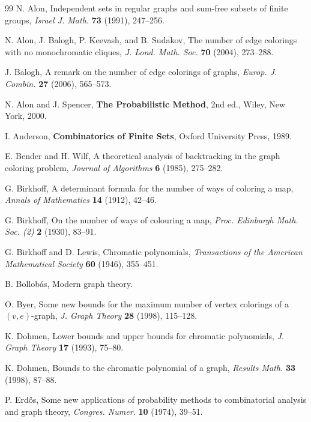 \documentclass[11pt]{article}
\begin{document}
\begin{thebibliography}{99}
 N. Alon, Independent sets in regular graphs
  and sum-free subsets of finite groups, \emph{Israel J. Math.}
  \textbf{73} (1991), 247--256.

 N. Alon, J. Balogh, P. Keevash, and B. Sudakov, The
  number of edge colorings with no monochromatic cliques,
  \emph{J. Lond. Math. Soc.} \textbf{70} (2004), 273--288.

 J. Balogh, A remark on the number of edge colorings
  of graphs, \emph{Europ. J. Combin.} \textbf{27} (2006), 565--573.

 N. Alon and J. Spencer, {\bf The Probabilistic Method},
  2nd ed., Wiley, New York, 2000.

 I. Anderson, \textbf{Combinatorics of Finite
    Sets}, Oxford University Press, 1989.

 E. Bender and H. Wilf, A theoretical analysis of
  backtracking in the graph coloring problem, \emph{Journal of
    Algorithms} \textbf{6} (1985), 275--282.


 G. Birkhoff, A determinant formula for the
  number of ways of coloring a map, \emph{Annals of Mathematics}
  \textbf{14} (1912), 42--46.

 G. Birkhoff, On the number of ways of
  colouring a map, \emph{Proc. Edinburgh Math. Soc. (2)} \textbf{2}
  (1930), 83--91.

 G. Birkhoff and D. Lewis, Chromatic
  polynomials, \emph{Transactions of the American Mathematical
    Society} \textbf{60} (1946), 355--451.

 B. Bollob\'as, Modern graph theory.

 O. Byer, Some new bounds for the maximum number of
  vertex colorings of a $(v,e)$-graph, \emph{J. Graph Theory}
  \textbf{28} (1998), 115--128.


 K. Dohmen, Lower bounds and upper bounds for
  chromatic polynomials, \emph{J. Graph Theory} \textbf{17} (1993),
  75--80.

 K. Dohmen, Bounds to the chromatic polynomial of a
  graph, \emph{Results Math.} \textbf{33} (1998), 87--88.


 P. Erd\H{o}s, Some new applications of
  probability methods to combinatorial analysis and graph theory,
  \emph{Congres. Numer.} \textbf{10} (1974), 39--51.


\end{thebibliography}
\end{document}
